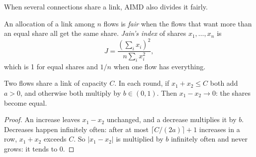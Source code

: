 When several connections share a link, AIMD also divides it fairly.

\begin{definition}\label{def:b2:transport-layer:fairness}
An allocation of a link among $n$ flows is \emph{fair} when the flows that want more than an equal
share all get the same share. \emph{Jain's index} of shares $x_1, \dots, x_n$ is
\[
J = \frac{(\sum_i x_i)^2}{n \sum_i x_i^2} ,
\]
which is 1 for equal shares and $1/n$ when one flow has everything.
\end{definition}

\begin{theorem}\label{thm:b2:transport-layer:aimd-fair}
Two flows share a link of capacity $C$. In each round, if $x_1 + x_2 \le C$ both add $a > 0$, and otherwise both
multiply by $b \in (0, 1)$. Then $x_1 - x_2 \to 0$: the shares become equal.
\end{theorem}

\begin{proof}
An increase leaves $x_1 - x_2$ unchanged, and a decrease multiplies it by $b$. Decreases happen infinitely often: after
at most $\lceil C / (2a) \rceil + 1$ increases in a row, $x_1 + x_2$ exceeds $C$. So $|x_1 - x_2|$ is multiplied by
$b$ infinitely often and never grows: it tends to 0.
\end{proof}

\begin{omfigure}
\par{}
\end{omfigure}


